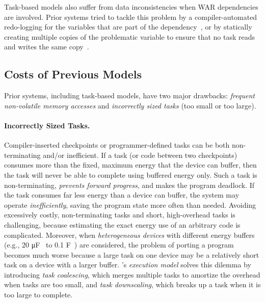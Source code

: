 Task-based models also suffer from data inconsistencies when WAR dependencies are involved. Prior systems tried to tackle this problem by a compiler-automated redo-logging for the variables that are part of the dependency~\cite{alpaca}, or by statically creating multiple copies of the problematic variable to ensure that no task reads and writes the same copy~\cite{chain}.

\subsection{Costs of Previous Models}
\label{sec:cost_task-based}

Prior systems, including task-based models, have two major drawbacks: {\em frequent non-volatile memory accesses} and {\em incorrectly sized tasks} (too small or too large).


\paragraph{Incorrectly Sized Tasks.}
Compiler-inserted checkpoints or programmer-defined tasks can be both non-terminating and/or inefficient.  If a task (or code between two checkpoints) consumes more than the fixed, maximum energy that the device can buffer, then the task will never be able to complete using buffered energy only.  Such a task is non-terminating, {\em prevents forward progress}, and makes the program deadlock. If the task consumes far less energy than a device can buffer, the system may operate {\em inefficiently}, saving the program state more often than needed. Avoiding excessively costly, non-terminating tasks and short, high-overhead tasks is challenging, because estimating the exact energy use of an arbitrary code is complicated. Moreover, when \emph{heterogeneous devices} with different energy buffers (e.g., 20 \si{\micro\farad}~\cite{rodriguez_tbcs_2015} to 0.1 \si{\farad}~\cite{moo}) are considered, the problem of porting a program becomes much worse because a large task on one device may be a relatively short task on a device with a larger buffer. \sys's \emph{execution model} solves this dilemma by introducing {\em task coalescing}, which merges multiple tasks to amortize the overhead when tasks are too small, and {\em task downscaling}, which breaks up a task when it is too large to complete. 
